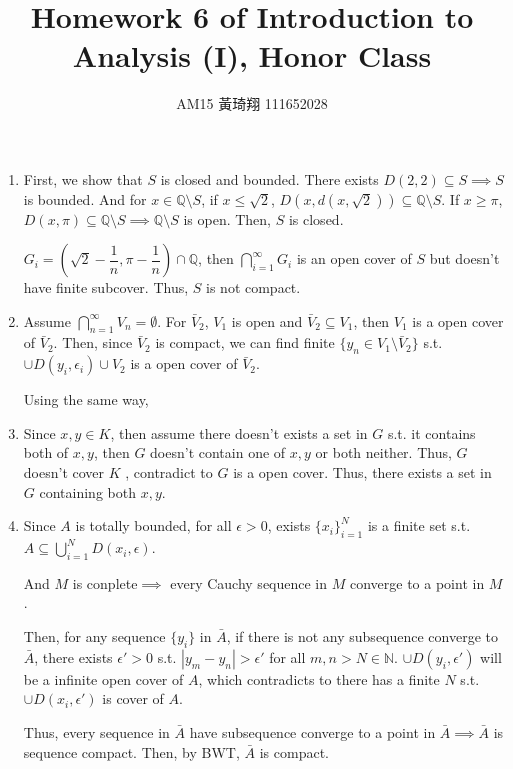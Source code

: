 \documentclass[12pt]{article}
\title{Homework 6 of Introduction to Analysis (I), Honor Class}
\author{AM15 黃琦翔 111652028}
\begin{document}
\maketitle
\begin{enumerate}
    \item First, we show that $S$ is closed and bounded. There exists $D(2, 2) \subseteq S\implies S$ is bounded.
    And for $x\in \mathbb{Q}\setminus S$, if $x\leq \sqrt{2}$, $D(x, d(x, \sqrt{2}))\subseteq \mathbb{Q}\setminus S$. If $x\geq \pi$, $D(x, \pi) \subseteq \mathbb{Q}\setminus S\implies \mathbb{Q}\setminus S$ is open.
    Then, $S$ is closed.

    $G_i = (\sqrt{2} - \dfrac{1}{n}, \pi - \dfrac{1}{n}) \cap \mathbb{Q}$, then $\displaystyle\bigcap_{i=1}^{\infty} G_i$ is an open cover of $S$ but doesn't have finite subcover.
    Thus, $S$ is not compact.

    \item Assume $\displaystyle\bigcap_{n=1}^{\infty} V_n = \emptyset$.
    For $\bar{V}_2$, $V_1$ is open and $\bar{V}_2 \subseteq V_1$, then $V_1$ is a open cover of $\bar{V}_2$.
    Then, since $\bar{V}_2$ is compact, we can find finite $\lbrace y_n \in V_1 \setminus \bar{V}_2\rbrace$ s.t. $\cup D(y_i, \epsilon_i) \cup V_2$ is a open cover of $\bar{V}_2$.

    Using the same way, 
    
    \item Since $x, y\in K$, then assume there doesn't exists a set in $G$ s.t. it contains both of $x, y$, then $G$ doesn't contain one of $x, y$ or both neither.
    Thus, $G$ doesn't cover $K$ , contradict to $G$ is a open cover. Thus, there exists a set in $G$ containing both $x, y$.

    \item Since $A$ is totally bounded, for all $\epsilon > 0$, exists $\lbrace x_i\rbrace_{i=1}^N$ is a finite set s.t. $A \subseteq \displaystyle\bigcup_{i=1}^N D(x_i, \epsilon)$.
    
    And $M$ is conplete$\implies$ every Cauchy sequence in $M$ converge to a point in $M$.

    Then, for any sequence $\lbrace y_i\rbrace$ in $\bar{A}$, if there is not any subsequence converge to $\bar{A}$, there exists $\epsilon' > 0$ s.t. $|y_m-y_n| > \epsilon'$ for all $m, n > N\in \mathbb{N}$.
    $\cup D(y_i, \epsilon')$ will be a infinite open cover of $A$, which contradicts to there has a finite $N$ s.t. $\cup D(x_i, \epsilon')$ is cover of $A$.

    Thus, every sequence in $\bar{A}$ have subsequence converge to a point in $\bar{A}\implies \bar{A}$ is sequence compact.
    Then, by BWT, $\bar{A}$ is compact.
\end{enumerate}
\end{document}
